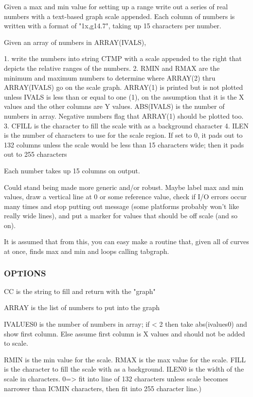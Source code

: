\begin{DoxyVerb}Given a max and min value for setting up a range
write out a series of real numbers with a text-based graph scale appended.
Each column of numbers is written with a format of "1x,g14.7", taking up
15 characters per number.

Given an array of numbers in ARRAY(IVALS),

  1. write the numbers into string CTMP with a scale appended to the right
     that depicts the relative ranges of the numbers.
  2. RMIN and RMAX are the minimum and maximum numbers to determine
     where ARRAY(2) thru ARRAY(IVALS) go on the scale graph.
     ARRAY(1) is printed but is not plotted unless IVALS is less than or
     equal to one (1), on the assumption that it is the X values and the
     other columns are Y values.
     ABS(IVALS) is the number of numbers in array. Negative numbers flag
     that ARRAY(1) should be plotted too.
  3. CFILL is the character to fill the scale with as a background
     character
  4. ILEN is the number of characters to use for the scale region.
     If set to 0, it pads out to 132 columns unless the scale would be
     less than 15 characters wide; then it pads out to 255 characters

Each number takes up 15 columns on output.

Could stand being made more generic and/or robust. Maybe label max
and min values, draw a vertical line at 0 or some reference value,
check if I/O errors occur many times and stop putting out message
(some platforms probably won't like really wide lines), and put a
marker for values that should be off scale (and so on).

It is assumed that from this, you can easy make a routine that, given
all of curves at once, finds max and min and loops calling tabgraph.
\end{DoxyVerb}


\subsubsection*{O\+P\+T\+I\+O\+NS}

\begin{DoxyVerb}  CC        is the string to fill and return with the "graph"

  ARRAY     is the list of numbers to put into the graph

  IVALUES0  is the number of numbers in array; if < 2 then take abs(ivalues0)
  and show first column. Else assume first column is X values and should not
  be added to scale.

  RMIN   is the min value for the scale.
  RMAX   is the max value for the scale.
  FILL   is the character to fill the scale with as a background.
  ILEN0  is the width of the scale in characters.
         0=> fit into line of 132 characters unless scale becomes narrower
         than ICMIN characters, then fit into 255 character line.)
\end{DoxyVerb}


